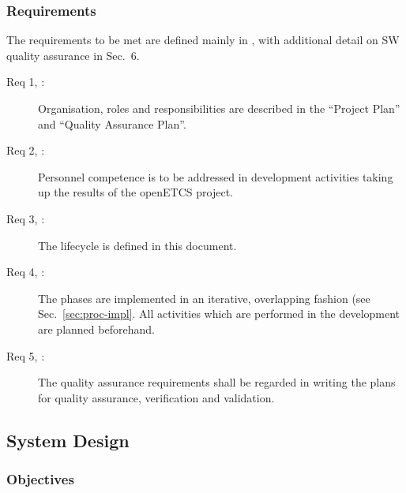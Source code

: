 \documentclass{template/openetcs_article}
\begin{document}
\subsubsection{Requirements}
\label{sec:0-requirements}

The requirements to be met are defined mainly in \cite[Sec.~5,
7.1]{EN50128:2011}, with additional detail on SW quality assurance in
Sec.~6.

 \begin{description}
\item[Req 1, {\cite[Sec.~5.1]{EN50128:2011}}:] Organisation, roles and
  responsibilities are described in the ``Project Plan'' and ``Quality
  Assurance Plan''.
\item[Req 2, {\cite[Sec.~5.2]{EN50128:2011}}:] Personnel competence is
  to be addressed in development activities taking up the results of
  the openETCS project.
\item[Req 3, {\cite[Sec.~5.3]{EN50128:2011}}:] The lifecycle is defined
  in this document.
\item[Req 4, {\cite[Sec.~7.1, 5.3.2.5]{EN50128:2011}}:] The phases are
  implemented in an iterative, overlapping fashion (see
  Sec.~\ref{sec:proc-impl}. All activities which are performed in the
  development are planned beforehand.
\item[Req 5, {\cite[Sec.~6]{EN50128:2011}}:] The quality assurance
  requirements shall be regarded in writing the plans for quality
  assurance, verification and validation.
 \end{description}

\subsection{System Design}
\label{sec:systemPhase}

\subsubsection{Objectives}
\label{sec:1-objectives}
\end{document}
